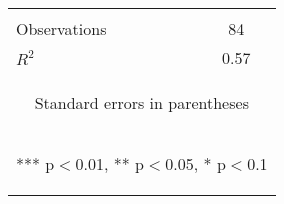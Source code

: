 \begin{center}
\begin{tabular}{lc}
\vspace{4pt} & \begin{footnotesize}\end{footnotesize} \\
Observations & 84 \\
 $R^2$ & 0.57 \\ \hline
\multicolumn{2}{c}{\begin{footnotesize} Standard errors in parentheses\end{footnotesize}} \\
\multicolumn{2}{c}{\begin{footnotesize} *** p$<$0.01, ** p$<$0.05, * p$<$0.1\end{footnotesize}} \\
\end{tabular}
\end{center}
